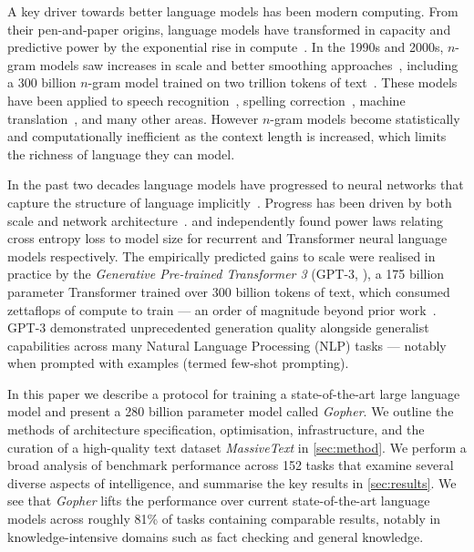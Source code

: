 \documentclass[11pt, a4paper, logo, internal, copyright, nonumbering]{deepmind}
\newcommand{\massivetext}{\textit{MassiveText}\xspace}
\newcommand{\gopher}{\textit{Gopher}\xspace}
\begin{document}
A key driver towards better language models has been modern computing. From their pen-and-paper origins, language models have transformed in capacity and predictive power by the exponential rise in compute~\citep{moore1965cramming}. In the 1990s and 2000s, $n$-gram models saw increases in scale and better smoothing approaches~\citep{ney1994structuring}, including a 300 billion $n$-gram model trained on two trillion tokens of text~\citep{brants2007large}.  These models have been applied to speech recognition~\citep{jelinek1997statistical}, spelling correction~\citep{brill2000improved}, machine translation~\citep{brown1990statistical}, and many other areas. However $n$-gram models become statistically and computationally inefficient as the context length is increased, which limits the richness of language they can model.


In the past two decades language models have progressed to neural networks that capture the structure of language implicitly~\citep{bengio2003neural, mikolov2010recurrent, graves2013generating, jozefowicz2016exploring, radford2019language}.
Progress has been driven by both scale and network architecture~\citep{hochreiter1997long,bahdanau2014neural,vaswani2017attention}.
\citet{rosenfeld2020a} and \citet{kaplan2020scaling} independently found power laws relating cross entropy loss to model size for recurrent and Transformer neural language models respectively.  The empirically predicted gains to scale were realised in practice by the \textit{Generative Pre-trained Transformer 3} (GPT-3, \citet{gpt3}), a 175 billion parameter Transformer trained over 300 billion tokens of text, which consumed zettaflops of compute to train --- an order of magnitude beyond prior work~\citep{rosset2020turing}. GPT-3 demonstrated unprecedented generation quality alongside generalist capabilities across many Natural Language Processing (NLP) tasks --- notably when prompted with examples (termed few-shot prompting).


In this paper we describe a protocol for training a state-of-the-art large language model and present a 280 billion parameter model called \gopher. We outline the methods of architecture specification, optimisation, infrastructure, and the curation of a high-quality text dataset \massivetext in \autoref{sec:method}. We perform a broad analysis of benchmark performance across 152 tasks that examine several diverse aspects of intelligence, and summarise the key results in \autoref{sec:results}. We see that \gopher lifts the performance over current state-of-the-art language models across roughly 81\% of tasks containing comparable results, notably in knowledge-intensive domains such as fact checking and general knowledge. 
\end{document}
